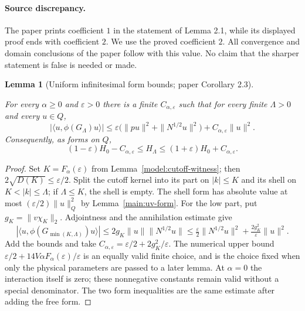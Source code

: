 \documentclass[11pt,a4paper]{article}
\newtheorem{lemma}[theorem]{Lemma}
\theoremstyle{definition}
\theoremstyle{remark}
\newcommand{\proofid}[1]{\par\smallskip{\normalfont\scriptsize\color{inkblue}Stable ID: \nolinkurl{#1}}\par\smallskip}
\begin{document}
\paragraph{Source discrepancy.} The paper prints coefficient $1$ in the
statement of Lemma 2.1, while its displayed proof ends with coefficient
$2$. We use the proved coefficient $2$. All convergence and domain
conclusions of the paper follow with this value. No claim that the
sharper statement is false is needed or made.

\begin{lemma}[Uniform infinitesimal form bounds; paper Corollary 2.3]
\label{main:uniform-form-bound}
\proofid{main:uniform-form-bound}
\par{}\par\smallskip

For every $\alpha\geq0$ and $\varepsilon>0$ there is a finite
$C_{\alpha,\varepsilon}$ such that
for every finite $\Lambda>0$ and every $u\in Q$,
\[
 |\langle u,\phi(G_\Lambda)u\rangle|
 \leq\varepsilon\bigl(\|pu\|^2+\|N^{1/2}u\|^2\bigr)
       +C_{\alpha,\varepsilon}\|u\|^2.
\]
Consequently, as forms on $Q$,
\[
 (1-\varepsilon)H_0-C_{\alpha,\varepsilon}
 \leq H_\Lambda\leq(1+\varepsilon)H_0+C_{\alpha,\varepsilon}.
\]
\end{lemma}
\begin{proof}
Set $K=F_\alpha(\varepsilon)$ from
Lemma~\ref{model:cutoff-witness}; then
$2\sqrt{D(K)}\leq\varepsilon/2$. Split the cutoff
kernel into its part on $|k|\leq K$ and its shell on $K<|k|\leq\Lambda$;
if $\Lambda\leq K$, the shell is empty. The shell form has absolute
value at most $(\varepsilon/2)\|u\|_Q^2$ by
Lemma~\ref{main:uv-form}. For the low part, put $g_K=\|v\chi_K\|_2$.
Adjointness and the annihilation estimate give
\[
 |\langle u,\phi(G_{\min(K,\Lambda)})u\rangle|
 \leq2g_K\|u\|\|N^{1/2}u\|
 \leq\tfrac\varepsilon2\|N^{1/2}u\|^2
       +\tfrac{2g_K^2}{\varepsilon}\|u\|^2.
\]
Add the bounds and take
$C_{\alpha,\varepsilon}=\varepsilon/2+2g_K^2/\varepsilon$.
The numerical upper bound
$\varepsilon/2+14V\alpha F_\alpha(\varepsilon)/\varepsilon$
is an equally valid finite choice, and is the choice fixed when
only the physical parameters are passed to a later lemma.
At $\alpha=0$ the interaction itself is zero; these nonnegative
constants remain valid without a special denominator. The two form
inequalities are the same estimate after adding the free form.
\end{proof}
\end{document}
